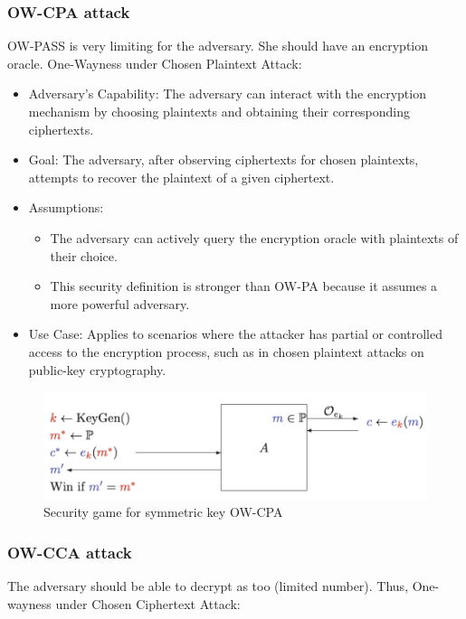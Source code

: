 \subsubsection{OW-CPA attack}
OW-PASS is very limiting for the adversary. She should have an encryption oracle. One-Wayness under Chosen Plaintext Attack:
\begin{itemize}
    \item Adversary's Capability: The adversary can interact with the encryption mechanism by choosing plaintexts and obtaining their corresponding ciphertexts.
    \item Goal: The adversary, after observing ciphertexts for chosen plaintexts, attempts to recover the plaintext of a given ciphertext.
    \item Assumptions:
    \begin{itemize}
        \item The adversary can actively query the encryption oracle with plaintexts of their choice.
        \item This security definition is stronger than OW-PA because it assumes a more powerful adversary.
    \end{itemize}
    \item Use Case: Applies to scenarios where the attacker has partial or controlled access to the encryption process, such as in chosen plaintext attacks on public-key cryptography.
\end{itemize}

\begin{figure}[h!]
    \centering
    \includegraphics[scale=0.5]{img/OWCPA.png}
    \caption{Security game for symmetric key OW-CPA}
\end{figure}

\subsubsection{OW-CCA attack}
The adversary should be able to decrypt as too (limited number). Thus, One-wayness under Chosen Ciphertext Attack:

